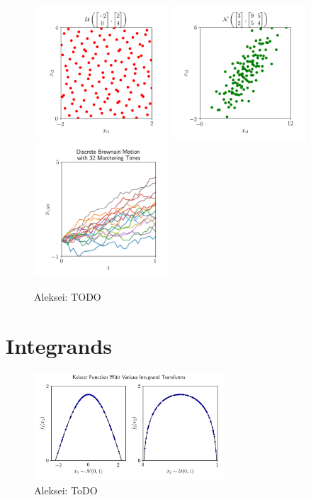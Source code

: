 \documentclass[graybox,footinfo]{svmult}
\newcommand{\AGSComment}[1]{{\color{cyan} Aleksei: #1}}
\begin{document}
\begin{figure}
	\includegraphics[height=5cm]{ags/figs/tm.uniform.png} 
	\qquad
	\includegraphics[height=5cm]{ags/figs/tm.gaussian.png}
	\qquad
	\includegraphics[height=5cm]{ags/figs/tm.brownian_motion.png}
	\caption{\AGSComment{TODO}}
	\label{fig:tm}
\end{figure}

\section{Integrands}



\begin{figure}
	\includegraphics[height=4cm]{ags/figs/i.keister_figs.png}
	\caption{\AGSComment{ToDO}} \label{fig:ikf}
\end{figure}
\end{document}
